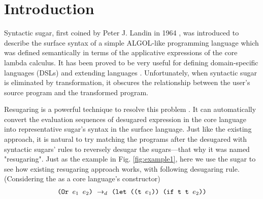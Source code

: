 \section{Introduction}









Syntactic sugar, first coined by Peter J. Landin in 1964 \cite{syntacticsugar}, was introduced to describe the surface syntax of a simple ALGOL-like programming language which was defined semantically in terms of the applicative expressions of the core lambda calculus. It has been proved to be very useful for defining domain-specific languages (DSLs) and extending languages \cite{FellFFKBMT18,CulpFFK19}.
Unfortunately, when syntactic sugar is eliminated by transformation, it obscures the relationship between the user’s source program and the transformed program.



Resugaring is a powerful technique to resolve this problem \cite{resugaring,hygienic}. It  can automatically convert the evaluation sequences of desugared expression in the core language into representative sugar's syntax in the surface language. Just like the existing approach, it is natural to try matching the programs after the desugared with syntactic sugars' rules to reversely desugar the sugars---that why it was named "resugaring". Just as the example in Fig. \ref{fig:example1}, here we use the sugar  to see how existing resugaring approach works, with following desugaring rule. (Considering the  as a core language's constructor)
\[
\begin{array}{l}
\texttt{(Or $e_1$ $e_2$)} ~\rightarrow_d~ \texttt{(let ((t $e_1$)) (if t t $e_2$))}\\
\end{array}
\]

